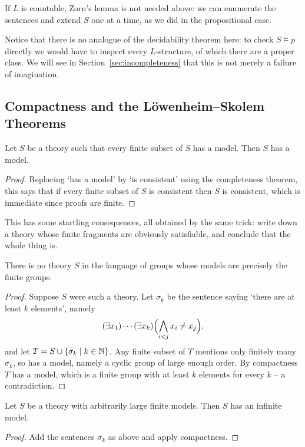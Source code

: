 \documentclass[a4paper]{scrartcl}
\begin{document}
\begin{remark}
  If $L$ is countable, Zorn's lemma is not needed above: we can enumerate the sentences and extend $S$ one at a time, as we did in the propositional case.
\end{remark}

Notice that there is no analogue of the decidability theorem here: to check $S \models p$ directly we would have to inspect every $L$-structure, of which there are a proper class. We will see in Section~\ref{sec:incompleteness} that this is not merely a failure of imagination.

\subsection{Compactness and the L\"owenheim--Skolem Theorems}

\begin{theorem}\label{thm:predcompactness}
  Let $S$ be a theory such that every finite subset of $S$ has a model. Then $S$ has a model.
\end{theorem}
\begin{proof}
  Replacing `has a model' by `is consistent' using the completeness theorem, this says that if every finite subset of $S$ is consistent then $S$ is consistent, which is immediate since proofs are finite.
\end{proof}

This has some startling consequences, all obtained by the same trick: write down a theory whose finite fragments are obviously satisfiable, and conclude that the whole thing is.

\begin{corollary}
  There is no theory $S$ in the language of groups whose models are precisely the finite groups.
\end{corollary}
\begin{proof}
  Suppose $S$ were such a theory. Let $\sigma_k$ be the sentence saying `there are at least $k$ elements', namely
  $$(\exists x_1)\cdots(\exists x_k)\Bigl(\bigwedge_{i < j} x_i \neq x_j\Bigr),$$
  and let $T = S \cup \{\sigma_k \mid k \in \mathbb{N}\}$. Any finite subset of $T$ mentions only finitely many $\sigma_k$, so has a model, namely a cyclic group of large enough order. By compactness $T$ has a model, which is a finite group with at least $k$ elements for every $k$ -- a contradiction.
\end{proof}

\begin{corollary}
  Let $S$ be a theory with arbitrarily large finite models. Then $S$ has an infinite model.
\end{corollary}
\begin{proof}
  Add the sentences $\sigma_k$ as above and apply compactness.
\end{proof}
\end{document}

